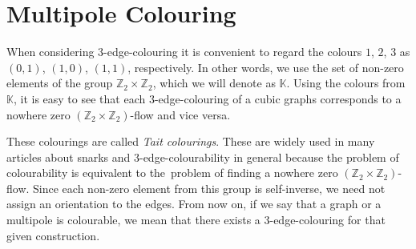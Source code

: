 \section{Multipole Colouring}\label{sec:multipole-colouring}


When considering $3$-edge-colouring it is convenient to regard the colours $1$, $2$, $3$ as $(0, 1)$, $(1, 0)$, $(1,1)$, respectively. In other words, we use the set of non-zero elements of the group $\mathbb{Z}_2\times\mathbb{Z}_2$, which we will denote as $\mathbb{K}$. Using the colours from $\mathbb{K}$, it is easy to see that each $3$-edge-colouring of a cubic graphs corresponds to a nowhere zero $(\mathbb{Z}_2\times\mathbb{Z}_2)$-flow and vice versa.

	

These colourings are called \textit{Tait colourings}. These are widely used in many articles about snarks and 3-edge-colourability in general because the problem of colourability is equivalent to the~problem of finding a nowhere zero $(\mathbb{Z}_2\times\mathbb{Z}_2)$-flow. Since each non-zero element from this group is self-inverse, we need not assign an orientation to the edges. From now on, if we say that a graph or a multipole is colourable, we mean that there exists a 3-edge-colouring for that given construction.

